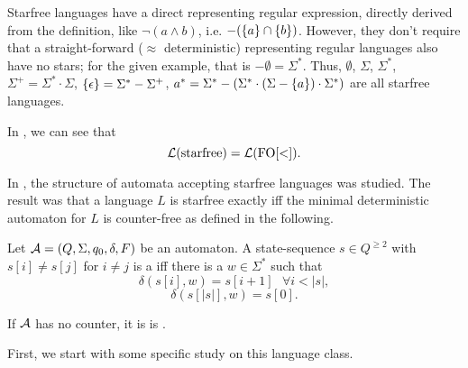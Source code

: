 Starfree languages have a direct representing regular expression, directly derived from the definition, like $\neg(a \wedge b)$, i.e. $-(\Set{a}\cap\Set{b})$. However, they don't require that a straight-forward ($\approx$ deterministic) representing regular languages also have no stars; for the given example, that is $-\emptyset = \Sigma^*$. Thus, $\emptyset$, $\Sigma$, $\Sigma^*$, $\Sigma^+ = \Sigma^* \cdot \Sigma$, $\Set{\epsilon} = \Sigma^* - \Sigma^+$, $a^* = \Sigma^* - (\Sigma^* \cdot (\Sigma - \Set{a}) \cdot \Sigma^*)$ are all starfree languages.

In \cite[Theorem 4.10]{LangAutLogicR102}, we can see that
\[ \mathcal{L}(\textup{\textrm{starfree}}) = \mathcal{L}(\mathrm{FO[<]}) . \]

In \cite{CounterFreeMcNaughton}, the structure of automata accepting starfree languages was studied. The result was that a language $L$ is starfree exactly iff the minimal deterministic automaton for $L$ is counter-free as defined in the following.

\begin{mydef}
Let $\mathcal{A} = (Q,\Sigma,q_0,\delta,F)$ be an automaton. A state-sequence $s \in Q^{\ge 2}$ with $s[i] \ne s[j]$ for $i \ne j$ is a  iff there is a $w \in \Sigma^*$ such that
\[ \delta(s[i], w) = s[i+1] \ \ \ \forall i < \left| s \right| , \]
\[ \delta(s[\left| s \right|], w) = s[0] . \]

If $\mathcal{A}$ has no counter, it is is .
\end{mydef}

First, we start with some specific study on this language class.


